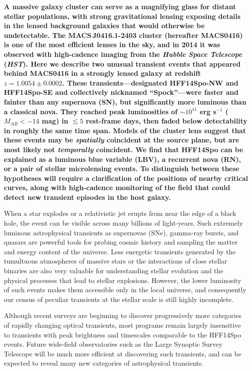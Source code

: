 \documentclass{article}
\def\HST{{\it HST}\xspace}
\def\spock{HFF14Spo\xspace}
\def\spockone{HFF14Spo-NW\xspace}
\def\spocktwo{HFF14Spo-SE\xspace}
\def\macs0416{MACS0416\xspace}
\def\fullmacs0416{MACS\,J0416.1-2403\xspace}
\begin{document}
\bigskip
{\bf
A massive galaxy cluster can serve as a magnifying glass for distant
stellar populations, with strong gravitational lensing exposing details
in the lensed background galaxies that would otherwise be undetectable.
The \fullmacs0416 cluster (hereafter \macs0416) is one of the most
efficient lenses in the sky, and in 2014 it was observed with high-cadence
imaging from the {\it Hubble Space Telescope} (\HST). Here we describe two
unusual transient events that appeared behind \macs0416 in a strongly lensed galaxy at redshift
$z=1.0054\pm0.0002$. These transients---designated
\spockone and \spocktwo and collectively nicknamed ``Spock''---were
faster and fainter than any supernova (SN), but significantly more luminous
than a classical nova. They reached peak luminosities of $\sim10^{41}$
erg s$^{-1}$ ($M_{AB}<-14$ mag) in $\lesssim5$ rest-frame days, then faded
below detectability in roughly the same time span.  Models of the
cluster lens suggest that these events may be {\it spatially}
coincident at the source plane, but are most likely not {\it
  temporally} coincident.  We find that \spock can be explained as a
luminous blue variable (LBV), a recurrent nova (RN), or a pair of stellar
microlensing events.  To distinguish between these hypotheses will
require a clarification of the positions of nearby critical curves,
along with high-cadence monitoring of the field that could detect new
transient episodes in the host galaxy.}



 When a star explodes or a relativistic jet erupts from near the edge
of a black hole, the event can be visible across many billions of
light-years.  Such extremely luminous astrophysical transients as
supernovae (SNe), gamma-ray bursts, and quasars are powerful tools for
probing cosmic history and sampling the matter and energy content of
the universe.  Less energetic transients generated by the tumultuous
atmospheres of massive stars or the interactions of close stellar
binaries are also very valuable for understanding stellar evolution
and the physical processes that lead to stellar explosions.  However,
the lower luminosity of such events makes them accessible only in
the local universe, and consequently our census of peculiar transients
at the stellar scale is still highly incomplete.

Although recent surveys are beginning to discover progressively more 
categories of rapidly changing optical
transients\cite{Kasliwal:2011a,Drout:2014}, most programs remain
largely insensitive to transients with peak brightness and timescales
comparable to the \spock events\cite{Berger:2013b}.  Future wide-field
observatories such as the Large Synoptic Survey
Telescope\cite{Tyson:2002} will be much more efficient at discovering
such transients, and can be expected to reveal many new categories of
astrophysical transients.
\end{document}
